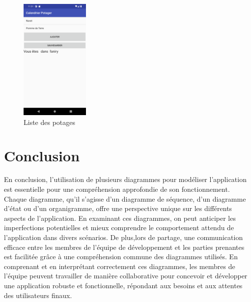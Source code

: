 \begin{figure}[H]
    	\center
    		\includegraphics[width=0.3\textwidth]{image/liste}
   		\caption{Liste des potages}
    	\label{Liste des potages}
	\end{figure}

\section{Conclusion}

En conclusion, l'utilisation de plusieurs diagrammes pour modéliser l'application est essentielle pour une compréhension approfondie de son fonctionnement. Chaque diagramme, qu'il s'agisse d'un diagramme de séquence, d'un diagramme d'état ou d'un organigramme, offre une perspective unique sur les différents aspects de l'application. En examinant ces diagrammes, on peut anticiper les imperfections potentielles et mieux comprendre le comportement attendu de l'application dans divers scénarios. De plus,lors de partage, une communication efficace entre les membres de l'équipe de développement et les parties prenantes est facilitée grâce à une compréhension commune des diagrammes utilisés. En comprenant et en interprétant correctement ces diagrammes, les membres de l'équipe peuvent travailler de manière collaborative pour concevoir et développer une application robuste et fonctionnelle, répondant aux besoins et aux attentes des utilisateurs finaux.